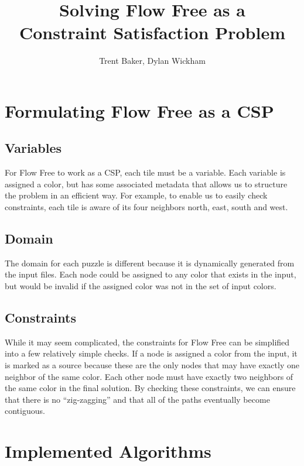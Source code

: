 \documentclass{article}
\title{Solving Flow Free as a \\ Constraint Satisfaction Problem}
\author{Trent Baker, Dylan Wickham}
\begin{document}
\maketitle

\section{Formulating Flow Free as a CSP}
    \subsection{Variables}
        For Flow Free to work as a CSP, each tile must be a variable. Each variable is assigned a color, but has some associated metadata that allows us to structure the problem in an efficient way. For example, to enable us to easily check constraints, each tile is aware of its four neighbors north, east, south and west.
    
    \subsection{Domain}
        The domain for each puzzle is different because it is dynamically generated from the input files. Each node could be assigned to any color that exists in the input, but would be invalid if the assigned color was not in the set of input colors.
    
    \subsection{Constraints}
        While it may seem complicated, the constraints for Flow Free can be simplified into a few relatively simple checks. If a node is assigned a color from the input, it is marked as a source because these are the only nodes that may have exactly one neighbor of the same color. Each other node must have exactly two neighbors of the same color in the final solution. By checking these constraints, we can ensure that there is no ``zig-zagging'' and that all of the paths eventually become contiguous.

\section{Implemented Algorithms}
\end{document}

